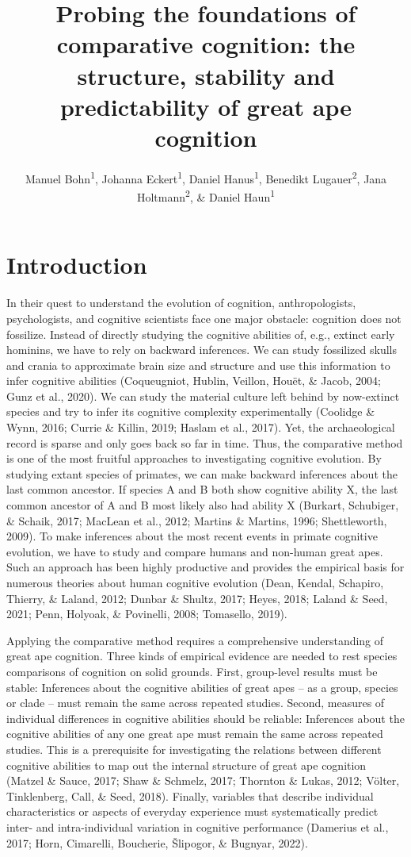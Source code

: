 \documentclass[
  man,floatsintext]{apa6}
\title{Probing the foundations of comparative cognition: the structure, stability and predictability of great ape cognition}
\author{Manuel Bohn\textsuperscript{1}, Johanna Eckert\textsuperscript{1}, Daniel Hanus\textsuperscript{1}, Benedikt Lugauer\textsuperscript{2}, Jana Holtmann\textsuperscript{2}, \& Daniel Haun\textsuperscript{1}}
\date{}
\affiliation{\vspace{0.5cm}\textsuperscript{1} Department of Comparative Cultural Psychology, Max Planck Institute for Evolutionary Anthropology, Leipzig, Germany\\\textsuperscript{2} Psychologische Hochschule Berlin, Berlin, Germany}
\begin{document}
\maketitle

\hypertarget{introduction}{%
\section{Introduction}\label{introduction}}

In their quest to understand the evolution of cognition, anthropologists, psychologists, and cognitive scientists face one major obstacle: cognition does not fossilize. Instead of directly studying the cognitive abilities of, e.g., extinct early hominins, we have to rely on backward inferences. We can study fossilized skulls and crania to approximate brain size and structure and use this information to infer cognitive abilities (Coqueugniot, Hublin, Veillon, Houët, \& Jacob, 2004; Gunz et al., 2020). We can study the material culture left behind by now-extinct species and try to infer its cognitive complexity experimentally (Coolidge \& Wynn, 2016; Currie \& Killin, 2019; Haslam et al., 2017). Yet, the archaeological record is sparse and only goes back so far in time. Thus, the comparative method is one of the most fruitful approaches to investigating cognitive evolution. By studying extant species of primates, we can make backward inferences about the last common ancestor. If species A and B both show cognitive ability X, the last common ancestor of A and B most likely also had ability X (Burkart, Schubiger, \& Schaik, 2017; MacLean et al., 2012; Martins \& Martins, 1996; Shettleworth, 2009). To make inferences about the most recent events in primate cognitive evolution, we have to study and compare humans and non-human great apes. Such an approach has been highly productive and provides the empirical basis for numerous theories about human cognitive evolution (Dean, Kendal, Schapiro, Thierry, \& Laland, 2012; Dunbar \& Shultz, 2017; Heyes, 2018; Laland \& Seed, 2021; Penn, Holyoak, \& Povinelli, 2008; Tomasello, 2019).

Applying the comparative method requires a comprehensive understanding of great ape cognition. Three kinds of empirical evidence are needed to rest species comparisons of cognition on solid grounds. First, group-level results must be stable: Inferences about the cognitive abilities of great apes -- as a group, species or clade -- must remain the same across repeated studies. Second, measures of individual differences in cognitive abilities should be reliable: Inferences about the cognitive abilities of any one great ape must remain the same across repeated studies. This is a prerequisite for investigating the relations between different cognitive abilities to map out the internal structure of great ape cognition (Matzel \& Sauce, 2017; Shaw \& Schmelz, 2017; Thornton \& Lukas, 2012; Völter, Tinklenberg, Call, \& Seed, 2018). Finally, variables that describe individual characteristics or aspects of everyday experience must systematically predict inter- and intra-individual variation in cognitive performance (Damerius et al., 2017; Horn, Cimarelli, Boucherie, Šlipogor, \& Bugnyar, 2022).
\end{document}
